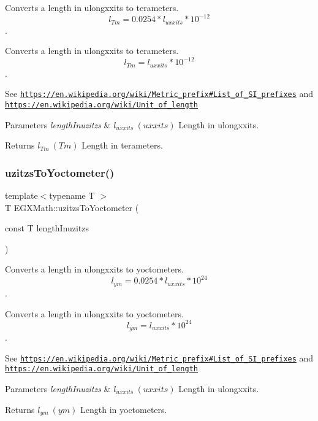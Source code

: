 Converts a length in ulongxxits to terameters. \[ l_{Tm}=0.0254 * l_{uxxits} * 10^{-12} \]. 

Converts a length in ulongxxits to terameters. \[ l_{Tm}=l_{uxxits} * 10^{-12} \].

See \href{https://en.wikipedia.org/wiki/Metric_prefix#List_of_SI_prefixes}{\tt https\+://en.\+wikipedia.\+org/wiki/\+Metric\+\_\+prefix\#\+List\+\_\+of\+\_\+\+S\+I\+\_\+prefixes} and \href{https://en.wikipedia.org/wiki/Unit_of_length}{\tt https\+://en.\+wikipedia.\+org/wiki/\+Unit\+\_\+of\+\_\+length} 
\begin{DoxyParams}{Parameters}
{\em length\+Inuzitzs} & $ l_{uxxits}\ (uxxits)$ Length in ulongxxits. \\
\hline
\end{DoxyParams}
\begin{DoxyReturn}{Returns}
$ l_{Tm}\ (Tm)$ Length in terameters. 
\end{DoxyReturn}
\mbox{\label{group___e_g_x_math-_conversions-_length_conversions-_imperial-uzitzs-_s_i_gae0faf7639d852bfde8863b3615aa096a}} 
\subsubsection{\texorpdfstring{uzitzs\+To\+Yoctometer()}{uzitzsToYoctometer()}}
{\footnotesize\ttfamily template$<$typename T $>$ \\
T E\+G\+X\+Math\+::uzitzs\+To\+Yoctometer (\begin{DoxyParamCaption}\item[{const T}]{length\+Inuzitzs }\end{DoxyParamCaption})}



Converts a length in ulongxxits to yoctometers. \[ l_{ym}=0.0254 * l_{uxxits} * 10^{24} \]. 

Converts a length in ulongxxits to yoctometers. \[ l_{ym}=l_{uxxits} * 10^{24} \].

See \href{https://en.wikipedia.org/wiki/Metric_prefix#List_of_SI_prefixes}{\tt https\+://en.\+wikipedia.\+org/wiki/\+Metric\+\_\+prefix\#\+List\+\_\+of\+\_\+\+S\+I\+\_\+prefixes} and \href{https://en.wikipedia.org/wiki/Unit_of_length}{\tt https\+://en.\+wikipedia.\+org/wiki/\+Unit\+\_\+of\+\_\+length} 
\begin{DoxyParams}{Parameters}
{\em length\+Inuzitzs} & $ l_{uxxits}\ (uxxits)$ Length in ulongxxits. \\
\hline
\end{DoxyParams}
\begin{DoxyReturn}{Returns}
$ l_{ym}\ (ym)$ Length in yoctometers. 
\end{DoxyReturn}
\mbox{\label{group___e_g_x_math-_conversions-_length_conversions-_imperial-uzitzs-_s_i_gac20be4db1eed0397d7925d5b7148dd94}} 
